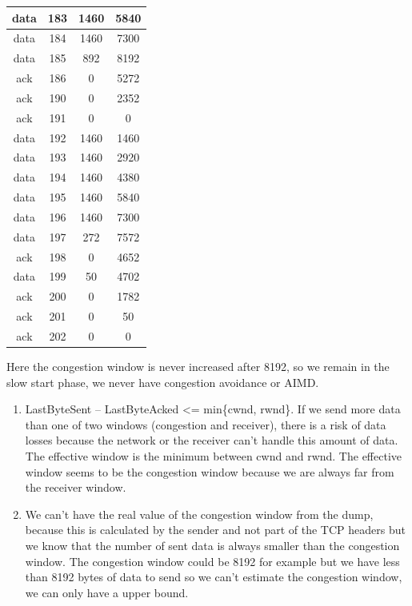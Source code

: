 \documentclass[a4paper,11pt,final]{report}
\begin{document}
\begin{longtable}{|c|c|c|c|}
data & 183 & 1460 & 5840 \\ \hline
data & 184 & 1460 & 7300 \\ \hline
data & 185 & 892 & 8192 \\ \hline
ack & 186 & 0 & 5272 \\ \hline
ack & 190 & 0 & 2352 \\ \hline
ack & 191 & 0 & 0 \\ \hline
data & 192 & 1460 & 1460 \\ \hline
data & 193 & 1460 & 2920 \\ \hline
data & 194 & 1460 & 4380 \\ \hline
data & 195 & 1460 & 5840 \\ \hline
data & 196 & 1460 & 7300 \\ \hline
data & 197 & 272 & 7572 \\ \hline
ack & 198 & 0 & 4652 \\ \hline
data & 199 & 50 & 4702 \\ \hline
ack & 200 & 0 & 1782 \\ \hline
ack & 201 & 0 & 50 \\ \hline
ack & 202 & 0 & 0 \\ \hline
\end{longtable}

Here the congestion window is never increased after 8192, so we remain
in the slow start phase, we never have congestion avoidance or AIMD.

\begin{enumerate}
\def\labelenumi{\arabic{enumi}.}
\setcounter{enumi}{13}
\item
  LastByteSent -- LastByteAcked \textless= min\{cwnd, rwnd\}. If we send
  more data than one of two windows (congestion and receiver), there is
  a risk of data losses because the network or the receiver can't handle
  this amount of data. The effective window is the minimum between cwnd
  and rwnd. The effective window seems to be the congestion window
  because we are always far from the receiver window.
\item
  We can't have the real value of the congestion window from the dump,
  because this is calculated by the sender and not part of the TCP
  headers but we know that the number of sent data is always smaller
  than the congestion window. The congestion window could be 8192 for
  example but we have less than 8192 bytes of data to send so we can't
  estimate the congestion window, we can only have a upper bound.
\end{enumerate}
\end{document}
